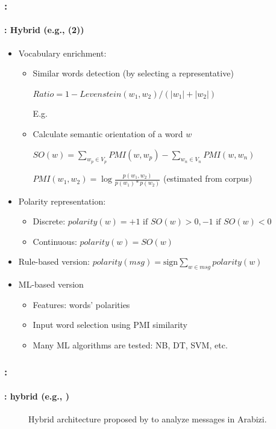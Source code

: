 \documentclass[xcolor=table]{beamer}
\begin{document}
\begin{frame}
	\frametitle{\insertshortsubtitle: \insertsection}
	\framesubtitle{\insertsubsection: Hybrid (e.g., \cite{18-bettiche-al} (2)) }
	
	\begin{itemize}
		\item Vocabulary enrichment: 
		\begin{itemize}
			\item Similar words detection (by selecting a representative)
			
			$Ratio = 1 - Levenstein(w_1, w_2)/(|w_1|+|w_2|)$
			
			E.g. 
			
			\item Calculate semantic orientation of a word $w$
			
			$SO(w) = \sum_{w_p \in V_p} PMI(w, w_p) - \sum_{w_n \in V_n} PMI(w, w_n)$
			
			$PMI (w_1, w_2) = \log \frac{p(w_1, w_2)}{p(w_1)*p(w_2)}$ (estimated from corpus)
		\end{itemize}
		\item Polarity representation:
		\begin{itemize}
			\item Discrete: $polarity(w) = +1 \text{ if } SO(w) > 0, -1 \text{ if } SO(w) < 0$
			\item Continuous: $polarity(w) = SO(w)$
		\end{itemize}
		\item Rule-based version: $polarity(msg) = \text{sign} \sum_{w \in msg} polarity(w)$
		\item ML-based version
		\begin{itemize}
			\item Features: words' polarities
			\item Input word selection using PMI similarity
			\item Many ML algorithms are tested: NB, DT, SVM, etc.
		\end{itemize}
	\end{itemize}
	
	
\end{frame}

\begin{frame}
	\frametitle{\insertshortsubtitle: \insertsection}
	\framesubtitle{\insertsubsection: hybrid (e.g., \cite{18-guellil-al})}
	
	\begin{figure}
		\centering
		\caption{Hybrid architecture proposed by \cite{18-guellil-al} to analyze messages in Arabizi.}
	\end{figure}
	
\end{frame}
\end{document}
